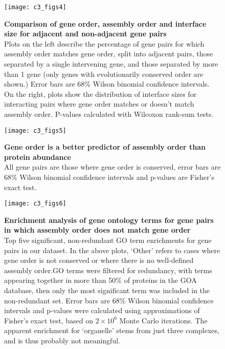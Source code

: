\documentclass[a4paper,11pt,twoside,openright]{scrbook}
\begin{document}
\begin{figure}
    \texttt{[image: c3\_figs4]}
    \caption[Comparison of gene order, assembly order and interface size for adjacent and non-adjacent gene pairs]{\sffamily \textbf{Comparison of gene order, assembly order and interface size for adjacent and non-adjacent gene pairs} \\ \small Plots on the left describe the percentage of gene pairs for which assembly order matches gene order, split into adjacent pairs, those separated by a single intervening gene, and those separated by more than 1 gene (only genes with evolutionarily conserved order are shown.) Error bars are 68\% Wilson binomial confidence intervals. On the right, plots show the distribution of interface sizes for interacting pairs where gene order matches or doesn't match assembly order. P-values calculated with Wilcoxon rank-sum tests.}
    \label{c3fs4}
\end{figure}

\begin{figure}
    \texttt{[image: c3\_figs5]}
    \caption[Gene order is a better predictor of assembly order than protein abundance]{\sffamily \textbf{Gene order is a better predictor of assembly order than protein abundance} \\ \small All gene pairs are those where gene order is conserved, error bars are 68\% Wilson binomial confidence intervals and p-values are Fisher's exact test.}
    \label{c3fs5}
\end{figure}

\begin{figure}
    \texttt{[image: c3\_figs6]}
    \caption[Enrichment analysis of gene ontology terms for gene pairs in which assembly order does not match gene order]{\sffamily \textbf{Enrichment analysis of gene ontology terms for gene pairs in which assembly order does not match gene order} \\ \small Top five significant, non-redundant GO term enrichments for gene pairs in our dataset. In the above plots, `Other' refers to cases where gene order is not conserved or where there is no well-defined assembly order.GO terms were filtered for redundancy, with terms appearing together in more than 50\% of proteins in the GOA database, then only the most significant term was included in the non-redundant set. Error bars are 68\% Wilson binomial confidence intervals and p-values were calculated using approximations of Fisher's exact test, based on \(2 \times 10^{6}\) Monte Carlo iterations. The apparent enrichment for `organelle' stems from just three complexes, and is thus probably not meaningful.}
    \label{c3fs6}
\end{figure}
\end{document}
